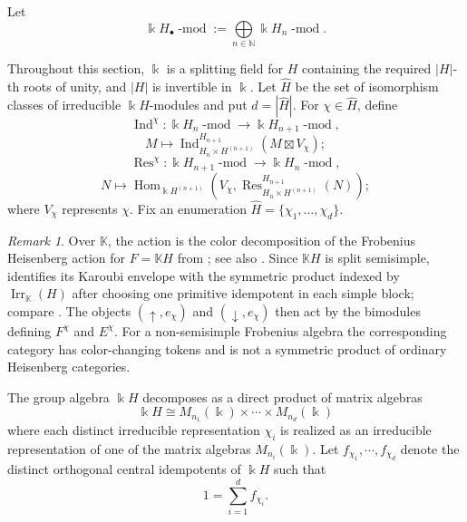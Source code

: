 \documentclass[12pt]{amsart}
\numberwithin{itemcounter}{subsection}
\theoremstyle{plain}
\theoremstyle{definition}
\theoremstyle{remark}
\newtheorem{remark}[theorem]{Remark}
\numberwithin{equation}{section}
\def\bbK{\mathbb{K}}
\def\bbN{\mathbb{N}}
\def\k{\Bbbk}
\def\Irr{{\operatorname{Irr}\nolimits}}
\def\Hom{\operatorname{Hom}\nolimits}
\def\Res{\operatorname{Res}\nolimits}
\def\Ind{\operatorname{Ind}\nolimits}
\def\mod{\operatorname{-mod}\nolimits}
\def\Hom{\operatorname{Hom}}
\begin{document}
Let $$\k H_\bullet\mod:=\bigoplus\limits_{n\in \bbN}\k H _n\mod.$$

Throughout this section, $\k$ is a splitting field for $H$ containing the
required $|H|$-th roots of unity, and $|H|$ is invertible in $\k$.
Let $\widehat H$ be the set of isomorphism classes of irreducible
$\k H$-modules and put $d=|\widehat H|$.  For $\chi\in\widehat H$, define
$$\Ind^{\chi}:\k H _n\mod\to \k H _{n+1}\mod,$$
$$M\mapsto \Ind^{ H _{n+1}}_{ H _n\times  H ^{(n+1)}}(M\boxtimes V_\chi);$$
$$\Res^{\chi}:\k H _{n+1}\mod\to \k H _n\mod,$$
$$N\mapsto \Hom_{\k H ^{(n+1)}}( V_\chi,\Res^{ H _{n+1}}_{ H _n\times  H ^{(n+1)}}(N));$$
where $V_\chi$ represents $\chi$.  Fix an enumeration
$\widehat H=\{\chi_1,\ldots,\chi_d\}$.

\begin{remark}\label{rem:frobenius-wreath}
Over $\bbK$, the action is the color decomposition of the Frobenius
Heisenberg action for $F=\bbK H$ from \cite[Theorem~7.4]{RS17}; see also
\cite[Theorem~1.4(b)]{Sav19}.  Since $\bbK H$ is split semisimple,
\cite[Theorem~8.3]{BSW21} identifies its Karoubi envelope with the symmetric
product indexed by $\Irr_{\bbK}(H)$ after choosing one primitive idempotent
in each simple block; compare \cite[Corollary~4.10]{Gan20}.  The objects
$(\uparrow,e_\chi)$ and $(\downarrow,e_\chi)$ then act by the bimodules
defining $F^\chi$ and $E^\chi$.  For a non-semisimple Frobenius algebra the
corresponding category has color-changing tokens and is not a symmetric
product of ordinary Heisenberg categories.
\end{remark}

The group algebra $\k H $ decomposes as a direct product of matrix algebras
$$\k H \cong M_{n_1}(\k)\times \cdots\times M_{n_d}(\k)$$
where each distinct irreducible representation $\chi_i$ is realized as an irreducible representation
of one of the matrix algebras $M_{n_i}(\k)$. Let $f_{\chi_1},\cdots, f_{\chi_d}$ denote the distinct  orthogonal central idempotents of $\k H $ such that
$$1=\sum_{i=1}^{d}f_{\chi_i}.$$
\end{document}
